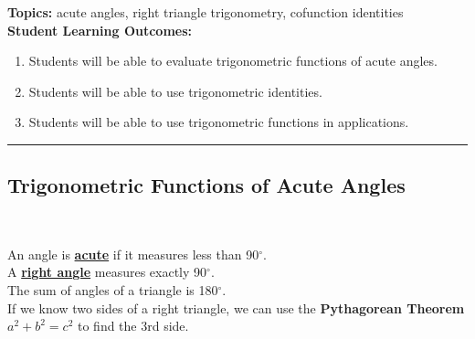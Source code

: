 

\noindent \textbf{Topics:}  acute angles, right triangle trigonometry, cofunction identities\\

\noindent \textbf{Student Learning Outcomes:}
\begin{enumerate}
\item Students will be able to evaluate trigonometric functions of acute angles.
\item Students will be able to use trigonometric identities.
\item Students will be able to use trigonometric functions in applications.
\end{enumerate}

\hrule 

\bigskip

\subsection{Trigonometric Functions of Acute Angles} ~

\noindent An angle is \textbf{\underline{acute}} if it measures less than 90$^{\circ}$.\\
A \textbf{\underline{right angle}} measures exactly 90$^{\circ}$.\\
The sum of angles of a triangle is 180$^{\circ}$.\\[.2in]

\noindent If we know two sides of a right triangle, we can use the
\textbf{Pythagorean Theorem} $a^2+b^2=c^2$ to find the 3rd side.


\begin{center}
\end{center}

